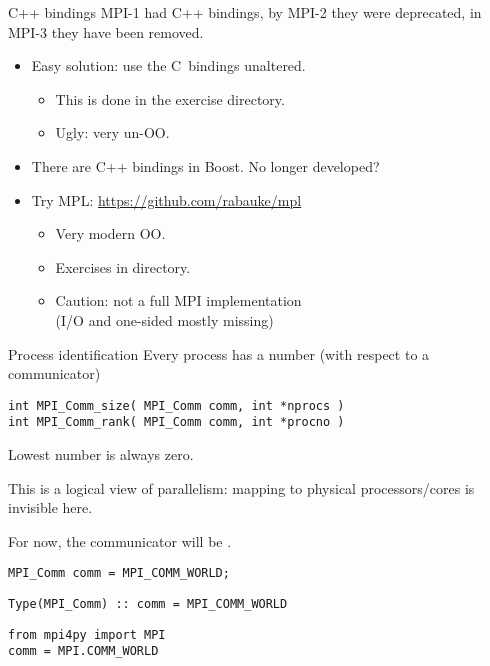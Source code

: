 \begin{numberedframe}{C++ bindings}
  MPI-1 had C++ bindings, by MPI-2 they were deprecated, in MPI-3 they have been removed.
  \begin{itemize}
  \item Easy solution: use the C~bindings unaltered.
    \begin{itemize}
    \item This is done in the  exercise directory.
    \item Ugly: very un-OO.
    \end{itemize}
  \item There are C++ bindings in Boost. No longer developed?
  \item Try MPL: \url{https://github.com/rabauke/mpl}
    \begin{itemize}
    \item Very modern OO.
    \item Exercises in  directory.
    \item Caution: not a full MPI implementation\\
      (I/O and one-sided mostly missing)
    \end{itemize}
  \end{itemize}
\end{numberedframe}

\begin{exerciseframe}[hello]
  
\end{exerciseframe}

\begin{numberedframe}{Process identification}
  \label{sl:comm-world}
Every process has a number (with respect to a communicator)
\lstset{language=C}
\begin{lstlisting}
int MPI_Comm_size( MPI_Comm comm, int *nprocs )
int MPI_Comm_rank( MPI_Comm comm, int *procno )
\end{lstlisting}
Lowest number is always zero.

This is a logical view of parallelism: mapping to physical
processors/cores is invisible here.

For now, the communicator will be .

\lstset{language=C}
\begin{lstlisting}
MPI_Comm comm = MPI_COMM_WORLD;
\end{lstlisting}

\lstset{language=Fortran}
\begin{lstlisting}
Type(MPI_Comm) :: comm = MPI_COMM_WORLD
\end{lstlisting}

\lstset{language=Python}
\begin{lstlisting}
from mpi4py import MPI
comm = MPI.COMM_WORLD
\end{lstlisting}

\lstset{language=C}
\end{numberedframe}

